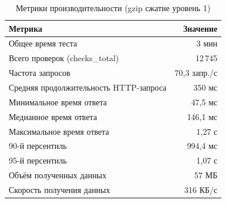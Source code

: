 \documentclass[12pt]{article}
\begin{document}
\begin{table}[h]
    \centering
    \caption{Метрики производительности (gzip сжатие уровень 1)}
    \begin{tabular}{lr}
        \toprule
        \textbf{Метрика}                       & \textbf{Значение} \\
        \midrule
        Общее время теста                      & 3 мин             \\
        \hline
        Всего проверок (checks\_total)         & 12\,745           \\
        Частота запросов                       & 70,3 запр./с      \\
        \hline
        Средняя продолжительность HTTP-запроса & 350 мс            \\
        Минимальное время ответа               & 47,5 мс           \\
        Медианное время ответа                 & 146,1 мс          \\
        Максимальное время ответа              & 1,27 с            \\
        90-й персентиль                        & 994,4 мс          \\
        95-й персентиль                        & 1,07 с            \\
        \hline
        Объём полученных данных                & 57 МБ             \\
        Скорость получения данных              & 316 КБ/с          \\
        \bottomrule
    \end{tabular}
\end{table}
\end{document}
